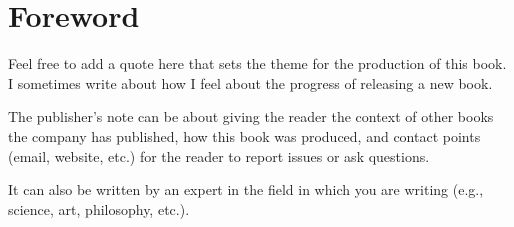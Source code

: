 

\chapter{Foreword}\label{foreword:cha}

\begin{myquotation}
Feel free to add a quote here that sets the theme for the production of this book. I sometimes write about how I feel about the progress of releasing a new book.\end{myquotation}

The publisher's note can be about giving the reader the context of other books the company has published, how this book was produced, and contact points (email, website, etc.) for the reader to report issues or ask questions.

It can also be written by an expert in the field in which you are writing (e.g., science, art, philosophy, etc.). 

\hfil{}\hfil
